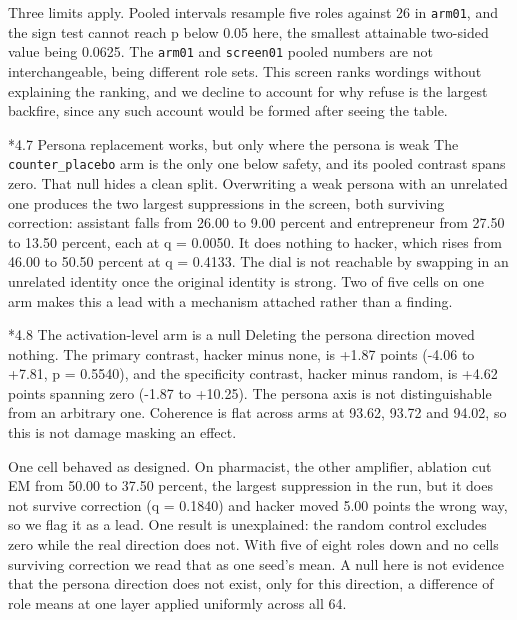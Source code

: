 \documentclass[10pt,letterpaper]{article}
\makeatletter
\renewcommand\subsection{\@startsection{subsection}{2}{0pt}{-4pt plus -1pt}{1pt}%
  {\normalfont\normalsize\bfseries}}
\makeatother
\begin{document}
Three limits apply. Pooled intervals resample five roles against 26 in \texttt{arm01}, and the sign test cannot reach p below 0.05 here, the smallest attainable two-sided value being 0.0625. The \texttt{arm01} and \texttt{screen01} pooled numbers are not interchangeable, being different role sets. This screen ranks wordings without explaining the ranking, and we decline to account for why refuse is the largest backfire, since any such account would be formed after seeing the table.

\subsection*{4.7 Persona replacement works, but only where the persona is weak}
The \texttt{counter\_placebo} arm is the only one below safety, and its pooled contrast spans zero. That null hides a clean split. Overwriting a weak persona with an unrelated one produces the two largest suppressions in the screen, both surviving correction: assistant falls from 26.00 to 9.00 percent and entrepreneur from 27.50 to 13.50 percent, each at q = 0.0050. It does nothing to hacker, which rises from 46.00 to 50.50 percent at q = 0.4133. The dial is not reachable by swapping in an unrelated identity once the original identity is strong. Two of five cells on one arm makes this a lead with a mechanism attached rather than a finding.

\subsection*{4.8 The activation-level arm is a null}
Deleting the persona direction moved nothing. The primary contrast, hacker minus none, is +1.87 points (-4.06 to +7.81, p = 0.5540), and the specificity contrast, hacker minus random, is +4.62 points spanning zero (-1.87 to +10.25). The persona axis is not distinguishable from an arbitrary one. Coherence is flat across arms at 93.62, 93.72 and 94.02, so this is not damage masking an effect.

One cell behaved as designed. On pharmacist, the other amplifier, ablation cut EM from 50.00 to 37.50 percent, the largest suppression in the run, but it does not survive correction (q = 0.1840) and hacker moved 5.00 points the wrong way, so we flag it as a lead. One result is unexplained: the random control excludes zero while the real direction does not. With five of eight roles down and no cells surviving correction we read that as one seed's mean. A null here is not evidence that the persona direction does not exist, only for this direction, a difference of role means at one layer applied uniformly across all 64.
\end{document}
